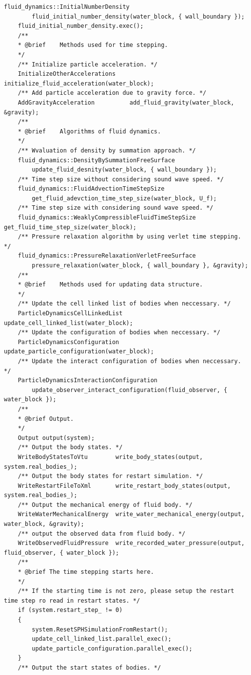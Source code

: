 \documentclass[12pt, a4paper,onecolumn]{article}
\begin{document}
\begin{lstlisting}[basicstyle=\ttfamily\footnotesize]
	fluid_dynamics::InitialNumberDensity 		
		fluid_initial_number_density(water_block, { wall_boundary });
	fluid_initial_number_density.exec();
	/**
	* @brief 	Methods used for time stepping.
	*/
	/** Initialize particle acceleration. */
	InitializeOtherAccelerations 	initialize_fluid_acceleration(water_block);
	/** Add particle acceleration due to gravity force. */
	AddGravityAcceleration 			add_fluid_gravity(water_block, &gravity);
	/**
	* @brief 	Algorithms of fluid dynamics.
	*/
	/** Wvaluation of density by summation approach. */
	fluid_dynamics::DensityBySummationFreeSurface 		
		update_fluid_desnity(water_block, { wall_boundary });
	/** Time step size without considering sound wave speed. */
	fluid_dynamics::FluidAdvectionTimeStepSize 			
		get_fluid_adevction_time_step_size(water_block, U_f);
	/** Time step size with considering sound wave speed. */
	fluid_dynamics::WeaklyCompressibleFluidTimeStepSize get_fluid_time_step_size(water_block);
	/** Pressure relaxation algorithm by using verlet time stepping. */
	fluid_dynamics::PressureRelaxationVerletFreeSurface 
		pressure_relaxation(water_block, { wall_boundary }, &gravity);
	/**
	* @brief 	Methods used for updating data structure.
	*/
	/** Update the cell linked list of bodies when neccessary. */
	ParticleDynamicsCellLinkedList			update_cell_linked_list(water_block);
	/** Update the configuration of bodies when neccessary. */
	ParticleDynamicsConfiguration 			update_particle_configuration(water_block);
	/** Update the interact configuration of bodies when neccessary. */
	ParticleDynamicsInteractionConfiguration 	
		update_observer_interact_configuration(fluid_observer, { water_block });
	/**
	* @brief Output.
	*/
	Output output(system);
	/** Output the body states. */
	WriteBodyStatesToVtu 		write_body_states(output, system.real_bodies_);
	/** Output the body states for restart simulation. */
	WriteRestartFileToXml		write_restart_body_states(output, system.real_bodies_);
	/** Output the mechanical energy of fluid body. */
	WriteWaterMechanicalEnergy 	write_water_mechanical_energy(output, water_block, &gravity);
	/** output the observed data from fluid body. */
	WriteObservedFluidPressure	write_recorded_water_pressure(output, fluid_observer, { water_block });
	/**
	* @brief The time stepping starts here.
	*/
	/** If the starting time is not zero, please setup the restart time step ro read in restart states. */
	if (system.restart_step_ != 0)
	{
		system.ResetSPHSimulationFromRestart();
		update_cell_linked_list.parallel_exec();
		update_particle_configuration.parallel_exec();
	}
	/** Output the start states of bodies. */

\end{lstlisting}
\end{document}

